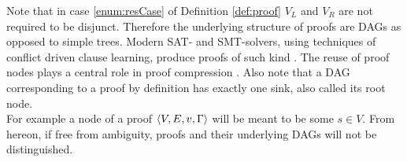 \noindent
Note that in case \ref{enum:resCase} of Definition \ref{def:proof} $V_L$ and $V_R$ are not required to be disjunct. 
Therefore the underlying structure of proofs are DAGs as opposed to simple trees. 
Modern SAT- and SMT-solvers, using techniques of conflict driven clause learning, produce proofs of such kind \cite{Bouton2009,Biere2009}.
The reuse of proof nodes plays a central role in proof compression \cite{Fontaine2011}.
Also note that a DAG corresponding to a proof by definition has exactly one sink, also called its root node.\\
For example a node of a proof $\langle V,E,v,\Gamma \rangle$ will be meant to be some $s \in V$.
From hereon, if free from ambiguity, proofs and their underlying DAGs will not be distinguished. 
